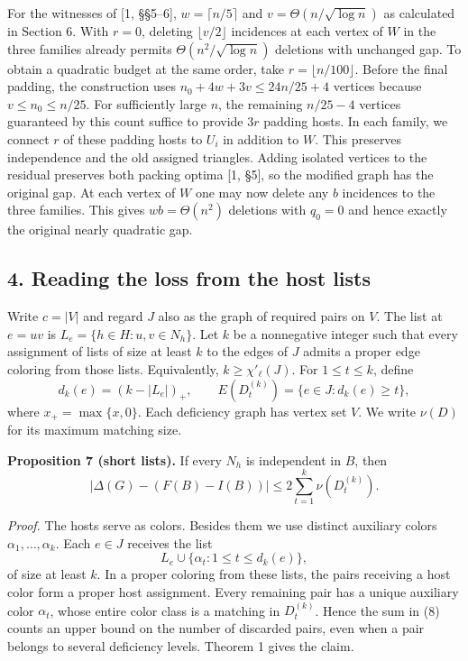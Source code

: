 \documentclass[english,11pt,a4paper]{article}
\begin{document}
For the witnesses of {[}1, §§5--6{]}, \(w=\lceil n/5\rceil\) and \(v=\Theta(n/\sqrt{\log n})\) as calculated in Section 6. With \(r=0\), deleting \(\lfloor v/2\rfloor\) incidences at each vertex of \(W\) in the three families already permits \(\Theta(n^2/\sqrt{\log n})\) deletions with unchanged gap. To obtain a quadratic budget at the same order, take \(r=\lfloor n/100\rfloor\). Before the final padding, the construction uses \(n_0+4w+3v\le24n/25+4\) vertices because \(v\le n_0\le n/25\). For sufficiently large \(n\), the remaining \(n/25-4\) vertices guaranteed by this count suffice to provide \(3r\) padding hosts. In each family, we connect \(r\) of these padding hosts to \(U_i\) in addition to \(W\). This preserves independence and the old assigned triangles. Adding isolated vertices to the residual preserves both packing optima {[}1, §5{]}, so the modified graph has the original gap. At each vertex of \(W\) one may now delete any \(b\) incidences to the three families. This gives \(wb=\Theta(n^2)\) deletions with \(q_0=0\) and hence exactly the original nearly quadratic gap.

\subsection{4. Reading the loss from the host lists}\label{reading-the-loss-from-the-host-lists}

Write \(c=|V|\) and regard \(J\) also as the graph of required pairs on \(V\). The list at \(e=uv\) is \(L_e=\{h\in H:u,v\in N_h\}\). Let \(k\) be a nonnegative integer such that every assignment of lists of size at least \(k\) to the edges of \(J\) admits a proper edge coloring from those lists. Equivalently, \(k\ge\chi'_\ell(J)\). For \(1\le t\le k\), define \[
d_k(e)=(k-|L_e|)_+,\qquad
E(D_t^{(k)})=\{e\in J:d_k(e)\ge t\},
\] where \(x_+=\max\{x,0\}\). Each deficiency graph has vertex set \(V\). We write \(\nu(D)\) for its maximum matching size.

\textbf{Proposition 7 (short lists).} If every \(N_h\) is independent in \(B\), then \[
|\Delta(G)-(F(B)-I(B))|\le 2\sum_{t=1}^{k}\nu(D_t^{(k)}). \tag{8}
\]

\emph{Proof.} The hosts serve as colors. Besides them we use distinct auxiliary colors \(\alpha_1,\ldots,\alpha_k\). Each \(e\in J\) receives the list \[
L_e\cup\{\alpha_t:1\le t\le d_k(e)\},
\] of size at least \(k\). In a proper coloring from these lists, the pairs receiving a host color form a proper host assignment. Every remaining pair has a unique auxiliary color \(\alpha_t\), whose entire color class is a matching in \(D_t^{(k)}\). Hence the sum in (8) counts an upper bound on the number of discarded pairs, even when a pair belongs to several deficiency levels. Theorem 1 gives the claim.
\end{document}
